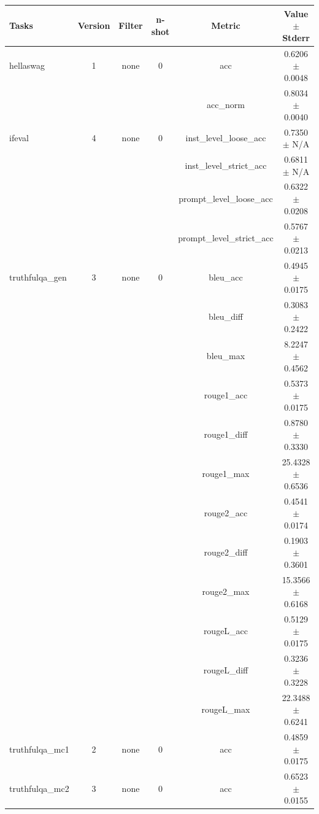 \documentclass{ifacconf}
\begin{document}
\vfill
\clearpage
\pagebreak

\begin{strip}
\begin{minipage}{\textwidth}
\begin{table}[H]
    \centering
    \begin{tabular}{|l|c|c|c|c|c|}
    \hline
    \textbf{Tasks} & \textbf{Version} & \textbf{Filter} & \textbf{n-shot} & \textbf{Metric} & \textbf{Value} $\pm$ \textbf{Stderr} \\ \hline
    hellaswag & 1 & none & 0 & acc & 0.6206 $\pm$ 0.0048 \\ \hline
    & & & & acc\_norm & 0.8034 $\pm$ 0.0040 \\ \hline
    ifeval & 4 & none & 0 & inst\_level\_loose\_acc & 0.7350 $\pm$ N/A \\ \hline
    & & & & inst\_level\_strict\_acc & 0.6811 $\pm$ N/A \\ \hline
    & & & & prompt\_level\_loose\_acc & 0.6322 $\pm$ 0.0208 \\ \hline
    & & & & prompt\_level\_strict\_acc & 0.5767 $\pm$ 0.0213 \\ \hline
    truthfulqa\_gen & 3 & none & 0 & bleu\_acc & 0.4945 $\pm$ 0.0175 \\ \hline
    & & & & bleu\_diff & 0.3083 $\pm$ 0.2422 \\ \hline
    & & & & bleu\_max & 8.2247 $\pm$ 0.4562 \\ \hline
    & & & & rouge1\_acc & 0.5373 $\pm$ 0.0175 \\ \hline
    & & & & rouge1\_diff & 0.8780 $\pm$ 0.3330 \\ \hline
    & & & & rouge1\_max & 25.4328 $\pm$ 0.6536 \\ \hline
    & & & & rouge2\_acc & 0.4541 $\pm$ 0.0174 \\ \hline
    & & & & rouge2\_diff & 0.1903 $\pm$ 0.3601 \\ \hline
    & & & & rouge2\_max & 15.3566 $\pm$ 0.6168 \\ \hline
    & & & & rougeL\_acc & 0.5129 $\pm$ 0.0175 \\ \hline
    & & & & rougeL\_diff & 0.3236 $\pm$ 0.3228 \\ \hline
    & & & & rougeL\_max & 22.3488 $\pm$ 0.6241 \\ \hline
    truthfulqa\_mc1 & 2 & none & 0 & acc & 0.4859 $\pm$ 0.0175 \\ \hline
    truthfulqa\_mc2 & 3 & none & 0 & acc & 0.6523 $\pm$ 0.0155 \\ \hline
    \end{tabular}
    \label{tab:qwen25_q6k}
    \end{table}


\end{minipage}
\end{strip}
\end{document}
